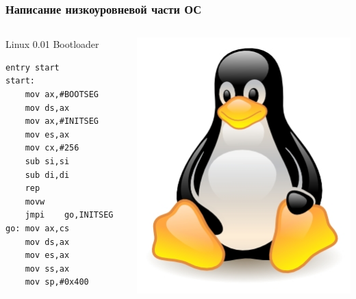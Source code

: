 \documentclass{beamer}
\begin{document}
    \begin{frame}[fragile]
    \frametitle{Написание низкоуровневой части ОС}
\begin{columns}
    \begin{block}{Linux 0.01 Bootloader}\small
\begin{verbatim}
entry start
start:
    mov ax,#BOOTSEG
    mov ds,ax
    mov ax,#INITSEG
    mov es,ax
    mov cx,#256
    sub si,si
    sub di,di
    rep
    movw
    jmpi    go,INITSEG
go: mov ax,cs
    mov ds,ax
    mov es,ax
    mov ss,ax
    mov sp,#0x400       
\end{verbatim}    
    \end{block}
    \includegraphics[width=\linewidth]{fig/linux-logo.jpg}
    \end{columns}
\end{frame}
\end{document}
